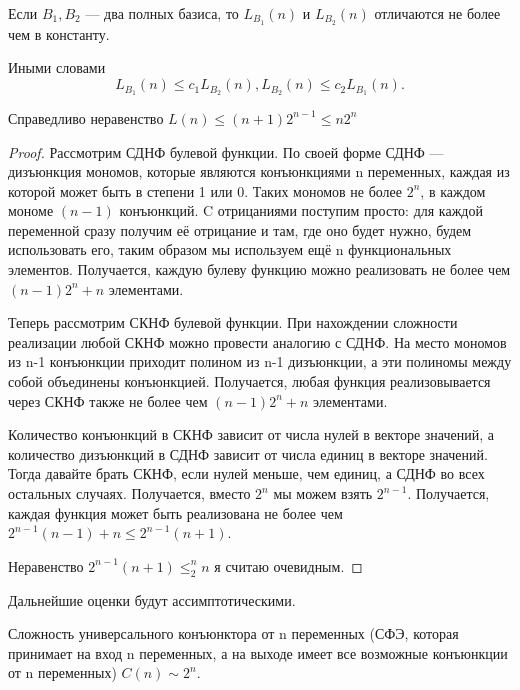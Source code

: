 \begin{theorem}
	Если $B_1, B_2$ --- два полных базиса, то $L_{B_1}(n)$ и  $L_{B_2}(n)$
	отличаются не более чем в константу.
	
	Иными словами \[
		L_{B_1}(n) \le c_1 L_{B_2}(n), L_{B_2}(n) \le c_2 L_{B_1}(n)
	.\]
\end{theorem}
\begin{theorem}
	Справедливо неравенство $L(n) \le (n+1)2^{n-1} \le n2^n$
\end{theorem}
\begin{proof}
Рассмотрим СДНФ булевой функции. По своей форме СДНФ --- дизъюнкция мономов,
которые являются конъюнкциями n переменных, каждая из которой может быть в
степени 1 или 0. Таких мономов не более $2^n$, в каждом мономе $(n-1)$ конъюнкций.
C отрицаниями поступим просто: для каждой переменной сразу получим её отрицание
и там, где оно будет нужно, будем использовать его, таким образом мы используем
ещё n функциональных элементов. Получается, каждую
булеву функцию можно реализовать не более чем  $\left( n-1 \right) 2^n + n$
элементами. 

Теперь рассмотрим СКНФ булевой функции. При нахождении сложности реализации
любой СКНФ можно провести аналогию с СДНФ. На место мономов из n-1 конъюнкции
приходит полином из n-1 дизъюнкции, а эти полиномы между собой объединены
конъюнкцией. Получается, любая функция реализовывается через СКНФ также не более
чем $\left( n-1 \right) 2^n + n$ элементами.

Количество конъюнкций в СКНФ зависит от числа нулей в векторе значений, а
количество дизъюнкций в СДНФ зависит от числа единиц в векторе значений. Тогда
давайте брать СКНФ, если нулей меньше, чем единиц, а СДНФ во всех остальных
случаях. Получается, вместо $2^n$ мы можем взять $2^{n-1}$. Получается, каждая
функция может быть реализована не более чем $2^{n-1}\left( n-1 \right) + n \le
2^{n-1}(n+1)$.

Неравенство $2^{n-1}(n+1)\le_2^n n$ я считаю очевидным.
\end{proof}
Дальнейшие оценки будут ассимптотическими.
\begin{theorem}
Сложность универсального конъюнктора от n переменных (СФЭ, которая принимает на
вход n переменных, а на выходе имеет все возможные конъюнкции от n переменных)
$C(n) \sim 2^n.$
\end{theorem}
